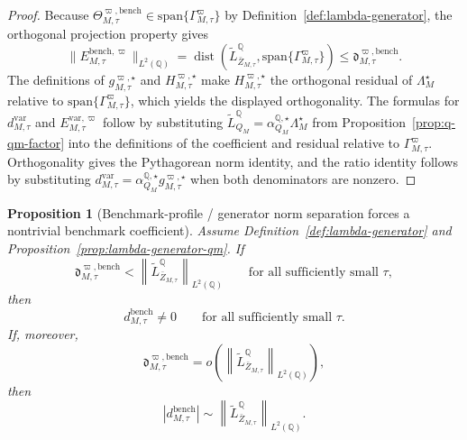 \documentclass[11pt,a4paper]{amsart}
\theoremstyle{plain}
\newtheorem{proposition}[theorem]{Proposition}
\theoremstyle{definition}
\theoremstyle{remark}
\DeclareMathOperator{\dist}{dist}
\newcommand{\QQ}{\mathbb{Q}}
\begin{document}
\begin{proof}
Because \(\Theta_{M,\tau}^{\varpi,\mathrm{bench}}\in \mathrm{span}\{\Gamma_{M,\tau}^\varpi\}\)
by Definition~\ref{def:lambda-generator}, the orthogonal projection property gives
\[
        \|E_{M,\tau}^{\mathrm{bench},\varpi}\|_{L^2(\QQ)}
        =
        \dist\!\left(
                \widetilde L_{\bar Z_{M,\tau}}^\QQ,
                \mathrm{span}\{\Gamma_{M,\tau}^\varpi\}
        \right)
        \le
        \mathfrak d_{M,\tau}^{\varpi,\mathrm{bench}}.
\]
The definitions of \(g_{M,\tau}^{\varpi,\star}\) and \(H_{M,\tau}^{\varpi,\star}\) make
\(H_{M,\tau}^{\varpi,\star}\) the orthogonal residual of \(\Lambda_M^\star\) relative to
\(\mathrm{span}\{\Gamma_{M,\tau}^\varpi\}\), which yields the displayed orthogonality.  The
formulas for \(d_{M,\tau}^{\mathrm{var}}\) and \(E_{M,\tau}^{\mathrm{var},\varpi}\) follow by
substituting \(\widetilde L_{Q_M}^\QQ=\alpha_{Q_M}^{\QQ,\star}\Lambda_M^\star\) from
Proposition~\ref{prop:q-qm-factor} into the definitions of the coefficient and residual relative
to \(\Gamma_{M,\tau}^\varpi\).  Orthogonality gives the Pythagorean norm identity, and the ratio
identity follows by substituting
\(d_{M,\tau}^{\mathrm{var}}=\alpha_{Q_M}^{\QQ,\star}g_{M,\tau}^{\varpi,\star}\) when both denominators are nonzero.
\end{proof}

\begin{proposition}[Benchmark-profile / generator norm separation forces a nontrivial benchmark coefficient]\label{prop:lambda-generator-separation}
Assume Definition~\ref{def:lambda-generator} and
Proposition~\ref{prop:lambda-generator-qm}.  If
\[
        \mathfrak d_{M,\tau}^{\varpi,\mathrm{bench}}
        <
        \left\|
                \widetilde L_{\bar Z_{M,\tau}}^\QQ
        \right\|_{L^2(\QQ)}
        \qquad
        \text{for all sufficiently small }\tau,
\]
then
\[
        d_{M,\tau}^{\mathrm{bench}}\neq0
        \qquad
        \text{for all sufficiently small }\tau.
\]
If, moreover,
\[
        \mathfrak d_{M,\tau}^{\varpi,\mathrm{bench}}
        =
        o\!\left(
                \left\|
                        \widetilde L_{\bar Z_{M,\tau}}^\QQ
                \right\|_{L^2(\QQ)}
        \right),
\]
then
\[
        \left|
                d_{M,\tau}^{\mathrm{bench}}
        \right|
        \sim
        \left\|
                \widetilde L_{\bar Z_{M,\tau}}^\QQ
        \right\|_{L^2(\QQ)}.
\]
\end{proposition}
\end{document}
